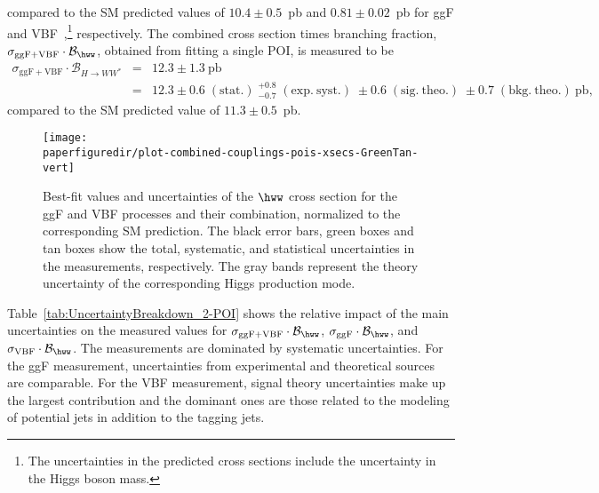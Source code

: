 compared to the SM predicted values of $10.4\pm 0.5$~pb and $0.81\pm 0.02$~pb for ggF and VBF~\cite{deFlorian:2016spz},\footnote{The uncertainties in the predicted cross sections include the uncertainty in the Higgs boson mass.} respectively.
The combined cross section times branching fraction, $\sigma_{\mathrm{ggF+VBF}} \cdot \mathcal{B}_{\hww}$, obtained from fitting a single POI, is measured to be
\begin{eqnarray*}
\sigma_{\mathrm{ggF+VBF}} \cdot \mathcal{B}_{H \to WW^{\ast}} &=& 12.3 \pm 1.3~\mathrm{pb} \\
&=& 12.3 \pm 0.6\;(\mathrm{stat.})\;^{+0.8}_{-0.7}\;(\mathrm{exp.\ syst.})\;\pm 0.6\;(\mathrm{sig.\ theo.})\;\pm 0.7\;(\mathrm{bkg.\ theo.})~\mathrm{pb},
\end{eqnarray*}
compared to the SM predicted value of $11.3\pm 0.5$~pb.

\begin{figure}[htb]
\centering
  \texttt{[image: \\paperfiguredir/plot-combined-couplings-pois-xsecs-GreenTan-vert]}
  \caption{
    Best-fit values and uncertainties of the $\hww$ cross section for the ggF and VBF processes and their combination, normalized to the corresponding SM prediction.
    The black error bars, green boxes and tan boxes show the total, systematic, and statistical uncertainties in the measurements, respectively.
    The gray bands represent the theory uncertainty of the corresponding Higgs production mode.
    \label{fig:couplings-POIs}
  }
\end{figure}


Table~\ref{tab:UncertaintyBreakdown_2-POI} shows the relative impact of the main uncertainties on the measured values for $\sigma_{\mathrm{ggF+VBF}} \cdot \mathcal{B}_{\hww}$, $\sigma_{\mathrm{ggF}} \cdot \mathcal{B}_{\hww}$, and $\sigma_{\mathrm{VBF}}  \cdot \mathcal{B}_{\hww}$.
The measurements are dominated by systematic uncertainties.
For the ggF measurement, uncertainties from experimental and theoretical sources are comparable.
For the VBF measurement, signal theory uncertainties make up the largest contribution and the dominant ones are those related to the modeling of potential jets in addition to the tagging jets.

